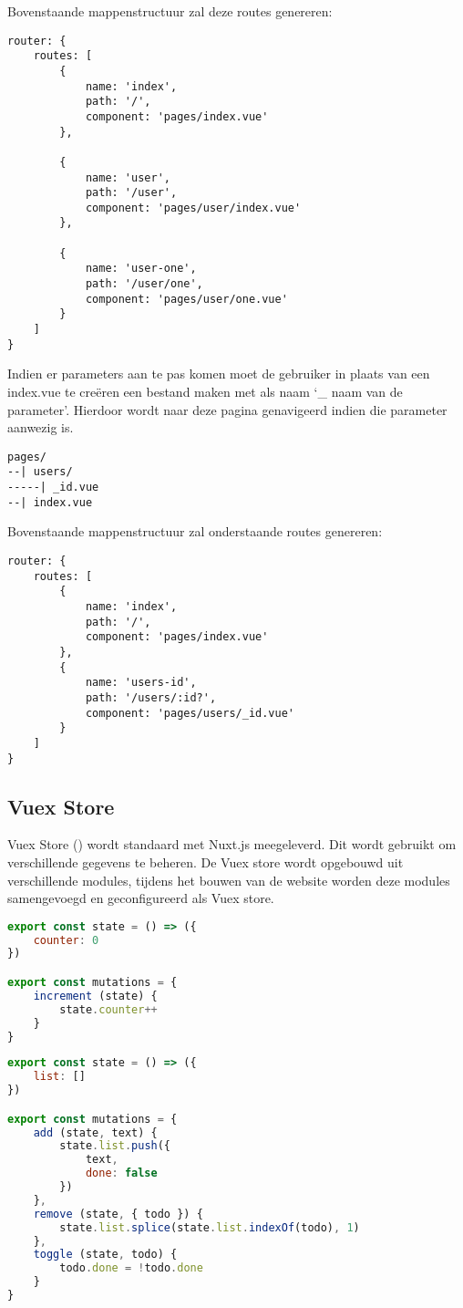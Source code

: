 Bovenstaande mappenstructuur zal deze routes genereren:

\begin{lstlisting}[caption=Routering generatie]
router: {
	routes: [
		{
			name: 'index',
			path: '/',
			component: 'pages/index.vue'
		},
		
		{
			name: 'user',
			path: '/user',
			component: 'pages/user/index.vue'
		},
		
		{
			name: 'user-one',
			path: '/user/one',
			component: 'pages/user/one.vue'
		}
	]
}
\end{lstlisting}

Indien er parameters aan te pas komen moet de gebruiker in plaats van een index.vue te creëren een bestand maken met als naam ‘\_ naam van de parameter’. Hierdoor wordt naar deze pagina genavigeerd indien die parameter aanwezig is.

\begin{lstlisting}[caption=Routering mappenstructuur met id parameter]
pages/
--| users/
-----| _id.vue
--| index.vue
\end{lstlisting}

Bovenstaande mappenstructuur zal onderstaande routes genereren: 

\begin{lstlisting}[caption=Routering generatie met id parameter]
router: {
	routes: [
		{
			name: 'index',
			path: '/',
			component: 'pages/index.vue'
		},
		{
			name: 'users-id',
			path: '/users/:id?',
			component: 'pages/users/_id.vue'
		}
	]
}
\end{lstlisting}


\subsection{Vuex Store}
Vuex Store (\cite{NUXT_VUEXSTORE}) wordt standaard met Nuxt.js meegeleverd. Dit wordt gebruikt om verschillende gegevens te beheren. De Vuex store wordt opgebouwd uit verschillende modules, tijdens het bouwen van de website worden deze modules samengevoegd en geconfigureerd als Vuex store.

\begin{lstlisting}[caption=Vuex store index.js, language=Javascript]
export const state = () => ({
	counter: 0
})

export const mutations = {
	increment (state) {
		state.counter++
	}
}
\end{lstlisting}

\begin{lstlisting}[caption=Vuex store todos.js, language=Javascript]
export const state = () => ({
	list: []
})

export const mutations = {
	add (state, text) {
		state.list.push({
			text,
			done: false
		})
	},
	remove (state, { todo }) {
		state.list.splice(state.list.indexOf(todo), 1)
	},
	toggle (state, todo) {
		todo.done = !todo.done
	}
}
\end{lstlisting}

